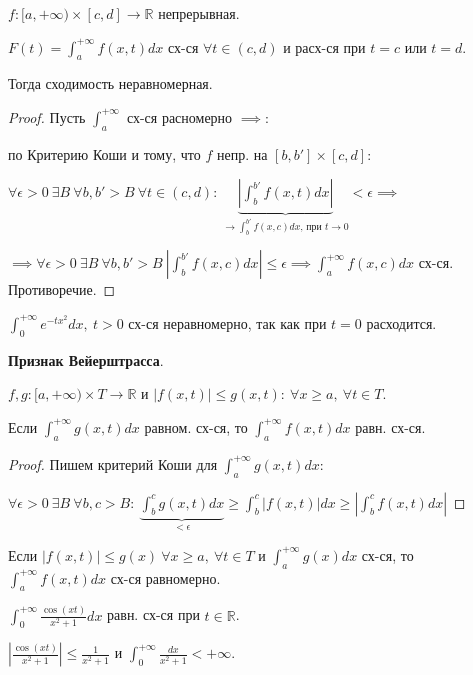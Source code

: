 \begin{consequence}
    $f: [a, +\infty) \times [c, d] \rightarrow \mathbb{R}$ непрерывная.

    $ F(t) = \int_{a}^{+\infty} { f(x, t) d x } $ сх-ся $\forall t \in (c, d)$ и расх-ся при $t=c$ или $t=d$.

    Тогда сходимость неравномерная.
\end{consequence}
\begin{proof}
    Пусть $\int_{a}^{+\infty}$ сх-ся расномерно $\implies$:

    по Критерию Коши и тому, что $f$ непр. на $[b, b'] \times [c, d]$:

    $\forall \epsilon > 0 \ \exists B \ \forall b, b' > B \ \forall t \in (c, d): \ \underbrace{\left| \int_{b}^{b'} { f(x, t) d x } \right|}_{\rightarrow \int_{b}^{b'} { f(x, c) d x } \text{, при } t \rightarrow 0} < \epsilon \implies$

    $\implies \forall \epsilon > 0 \ \exists B \ \forall b, b' > B \ \left| \int_{b}^{b'} { f(x, c) dx } \right| \leq \epsilon \implies \int_{a}^{+\infty} { f(x, c) dx }$ сх-ся. Противоречие.
\end{proof}

\begin{example}
    $\int_{0}^{+\infty} { e^{-tx^2} dx }, \ t > 0$ сх-ся неравномерно, так как при $t = 0$ расходится.
\end{example}

\begin{theorem}
    \textbf{Признак Вейерштрасса}.

    $f, g: [a, +\infty) \times T \rightarrow \mathbb{R}$ и $|f(x, t)| \leq g(x, t): \ \forall x \geq a, \ \forall t \in T$.

    Если $\int_{a}^{+\infty} { g(x, t) dx }$ равном. сх-ся, то $\int_{a}^{+\infty} { f(x, t) dx }$ равн. сх-ся.
\end{theorem}
\begin{proof}
    Пишем критерий Коши для $\int_{a}^{+\infty} { g(x, t) dx }$:

    $\forall \epsilon > 0 \ \exists B \ \forall b, c > B: \ \underbrace{\int_{b}^{c} { g(x, t) dx }}_{< \epsilon} \geq \int_{b}^{c} { |f(x, t)| dx } \geq \left| \int_{b}^{c} { f(x, t) d x } \right|$
\end{proof}

\begin{consequence}
    Если $\left| f(x, t) \right| \leq g(x) \ \forall x \geq a, \ \forall t \in T$ и $\int_{a}^{+\infty} { g(x) dx }$ сх-ся, то $\int_{a}^{+\infty} { f(x, t) dx }$ сх-ся равномерно.
\end{consequence}
\begin{example}
    $\int_{0}^{+\infty} { \frac{\cos(xt)}{x^2 + 1} dx }$ равн. сх-ся при $t \in \mathbb{R}$.

    $\left| \frac{\cos(xt)}{x^2 + 1} \right| \leq \frac{1}{x^2 + 1}$ и $\int_0^{+\infty} { \frac{dx}{x^2+1} } < +\infty$.
\end{example}


